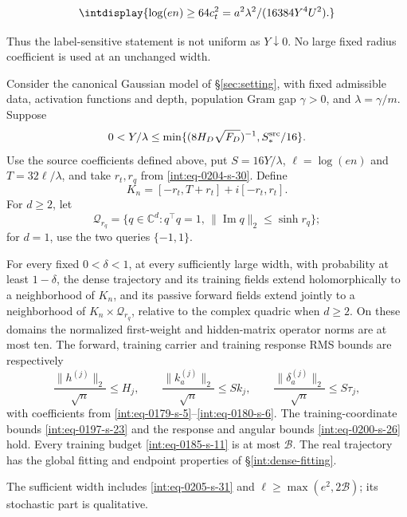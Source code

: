 \begingroup\renewcommand{\theHequation}{intdisplay.420}
\begin{equation*}
\intdisplay{
\log(en)\ge64c_t^2
 =a^2\lambda^2/(16384Y^4U^2).
}
\end{equation*}
\endgroup


Thus the label-sensitive statement is not uniform as \(Y\downarrow0\). No large fixed radius coefficient is used at an unchanged width.

\begin{lemma}
\label{int:source-event}
Consider the canonical Gaussian model of \S\ref{sec:setting}, with
fixed admissible data, activation functions and depth, population Gram
gap \(\gamma>0\), and \(\lambda=\gamma/m\). Suppose
\[
 0<Y/\lambda\le
 \min\{(8H_D\sqrt{F_D})^{-1},S_*^{\rm src}/16\}.
\]
Use the source coefficients defined above, put
\(S=16Y/\lambda\), \(\ell=\log(en)\) and \(T=32\ell/\lambda\), and take
\(r_t,r_q\) from \eqref{int:eq-0204-s-30}. Define
\[
 K_n=[-r_t,T+r_t]+i[-r_t,r_t].
\]
For \(d\ge2\), let
\[
 \mathcal Q_{r_q}
 =\{q\in\mathbb C^d:q^\top q=1,\,
                   \|\operatorname{Im}q\|_2\le\sinh r_q\};
\]
for \(d=1\), use the two queries \(\{-1,1\}\).

For every fixed \(0<\delta<1\), at every sufficiently large width,
with probability at least \(1-\delta\), the dense trajectory and its
training fields extend holomorphically to a neighborhood of \(K_n\),
and its passive forward fields extend jointly to a neighborhood of
\(K_n\times\mathcal Q_{r_q}\), relative to the complex quadric
when \(d\ge2\). On these domains the normalized first-weight and
hidden-matrix operator norms are at most ten. The forward, training
carrier and training response RMS bounds are respectively
\[
 \frac{\|h^{(j)}\|_2}{\sqrt n}\le H_j,\qquad
 \frac{\|k_a^{(j)}\|_2}{\sqrt n}\le Sk_j,\qquad
 \frac{\|\delta_a^{(j)}\|_2}{\sqrt n}\le S\tau_j,
\]
with coefficients from
\eqref{int:eq-0179-s-5}--\eqref{int:eq-0180-s-6}.
The training-coordinate bounds \eqref{int:eq-0197-s-23} and the
response and angular bounds \eqref{int:eq-0200-s-26} hold.
Every training budget \eqref{int:eq-0185-s-11} is at most
\(\mathcal B\). The real trajectory has the global fitting and
endpoint properties of \S\ref{int:dense-fitting}.

The sufficient width includes \eqref{int:eq-0205-s-31} and
\(\ell\ge\max(e^2,2\mathcal B)\); its stochastic part is qualitative.
\end{lemma}

